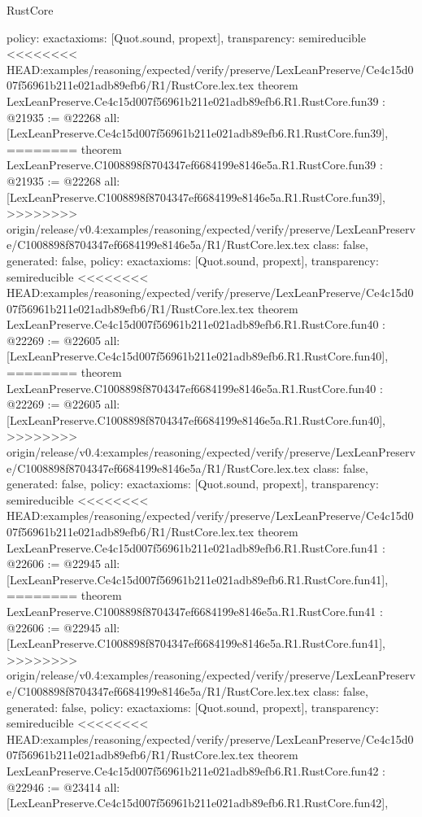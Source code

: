 \begin{lexlean}{RustCore}
\begin{coremodule}
{\begin{coremodule}
{{{{{{{{{{{{{{{{{{{{{{{{{{{{{{{{{{{{{{{{{{  policy: exact{axioms: [Quot.sound, propext]},
  transparency: semireducible
}
<<<<<<<< HEAD:examples/reasoning/expected/verify/preserve/LexLeanPreserve/Ce4c15d007f56961b211e021adb89efb6/R1/RustCore.lex.tex
theorem LexLeanPreserve.Ce4c15d007f56961b211e021adb89efb6.R1.RustCore.fun39 : @21935 := @22268 {
  all: [LexLeanPreserve.Ce4c15d007f56961b211e021adb89efb6.R1.RustCore.fun39],
========
theorem LexLeanPreserve.C1008898f8704347ef6684199e8146e5a.R1.RustCore.fun39 : @21935 := @22268 {
  all: [LexLeanPreserve.C1008898f8704347ef6684199e8146e5a.R1.RustCore.fun39],
>>>>>>>> origin/release/v0.4:examples/reasoning/expected/verify/preserve/LexLeanPreserve/C1008898f8704347ef6684199e8146e5a/R1/RustCore.lex.tex
  class: false,
  generated: false,
  policy: exact{axioms: [Quot.sound, propext]},
  transparency: semireducible
}
<<<<<<<< HEAD:examples/reasoning/expected/verify/preserve/LexLeanPreserve/Ce4c15d007f56961b211e021adb89efb6/R1/RustCore.lex.tex
theorem LexLeanPreserve.Ce4c15d007f56961b211e021adb89efb6.R1.RustCore.fun40 : @22269 := @22605 {
  all: [LexLeanPreserve.Ce4c15d007f56961b211e021adb89efb6.R1.RustCore.fun40],
========
theorem LexLeanPreserve.C1008898f8704347ef6684199e8146e5a.R1.RustCore.fun40 : @22269 := @22605 {
  all: [LexLeanPreserve.C1008898f8704347ef6684199e8146e5a.R1.RustCore.fun40],
>>>>>>>> origin/release/v0.4:examples/reasoning/expected/verify/preserve/LexLeanPreserve/C1008898f8704347ef6684199e8146e5a/R1/RustCore.lex.tex
  class: false,
  generated: false,
  policy: exact{axioms: [Quot.sound, propext]},
  transparency: semireducible
}
<<<<<<<< HEAD:examples/reasoning/expected/verify/preserve/LexLeanPreserve/Ce4c15d007f56961b211e021adb89efb6/R1/RustCore.lex.tex
theorem LexLeanPreserve.Ce4c15d007f56961b211e021adb89efb6.R1.RustCore.fun41 : @22606 := @22945 {
  all: [LexLeanPreserve.Ce4c15d007f56961b211e021adb89efb6.R1.RustCore.fun41],
========
theorem LexLeanPreserve.C1008898f8704347ef6684199e8146e5a.R1.RustCore.fun41 : @22606 := @22945 {
  all: [LexLeanPreserve.C1008898f8704347ef6684199e8146e5a.R1.RustCore.fun41],
>>>>>>>> origin/release/v0.4:examples/reasoning/expected/verify/preserve/LexLeanPreserve/C1008898f8704347ef6684199e8146e5a/R1/RustCore.lex.tex
  class: false,
  generated: false,
  policy: exact{axioms: [Quot.sound, propext]},
  transparency: semireducible
}
<<<<<<<< HEAD:examples/reasoning/expected/verify/preserve/LexLeanPreserve/Ce4c15d007f56961b211e021adb89efb6/R1/RustCore.lex.tex
theorem LexLeanPreserve.Ce4c15d007f56961b211e021adb89efb6.R1.RustCore.fun42 : @22946 := @23414 {
  all: [LexLeanPreserve.Ce4c15d007f56961b211e021adb89efb6.R1.RustCore.fun42],
}}}}}}}}}}}}}}}}}}}}}}}}}}}}}}}}}}}}}}}}}}}}}
\end{coremodule}}
\end{coremodule}
\end{lexlean}
